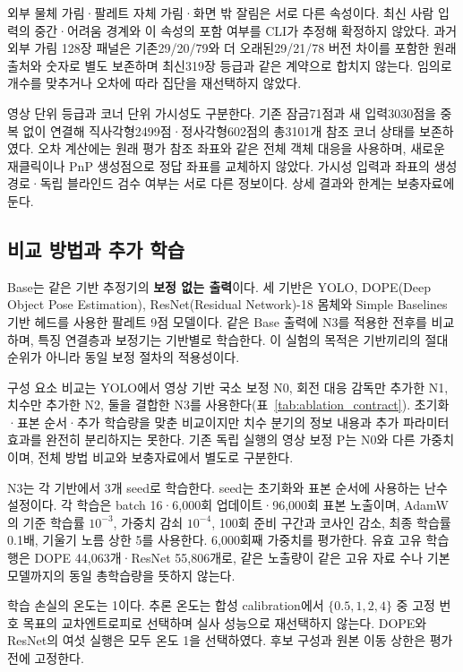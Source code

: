 외부 물체 가림·팔레트 자체 가림·화면 밖 잘림은 서로 다른 속성이다. 최신 사람 입력의 중간·어려움 경계와 이 속성의 포함 여부를 CLI가 추정해 확정하지 않았다. 과거 외부 가림 128장 패널은 기존29/20/79와 더 오래된29/21/78 버전 차이를 포함한 원래 출처와 숫자로 별도 보존하며 최신319장 등급과 같은 계약으로 합치지 않는다. 임의로 개수를 맞추거나 오차에 따라 집단을 재선택하지 않았다.

영상 단위 등급과 코너 단위 가시성도 구분한다. 기존 잠금71점과 새 입력3030점을 중복 없이 연결해 직사각형2499점·정사각형602점의 총3101개 참조 코너 상태를 보존하였다. 오차 계산에는 원래 평가 참조 좌표와 같은 전체 객체 대응을 사용하며, 새로운 재클릭이나 PnP 생성점으로 정답 좌표를 교체하지 않았다. 가시성 입력과 좌표의 생성 경로·독립 블라인드 검수 여부는 서로 다른 정보이다. 상세 결과와 한계는 보충자료에 둔다.


\subsection{비교 방법과 추가 학습}
Base는 같은 기반 추정기의 \textbf{보정 없는 출력}이다. 세 기반은 YOLO, DOPE(Deep Object Pose Estimation)\cite{dope2018}, ResNet(Residual Network)-18 몸체\cite{resnet2016}와 Simple Baselines 기반 헤드\cite{simple2018}를 사용한 팔레트 9점 모델이다. 같은 Base 출력에 N3를 적용한 전후를 비교하며, 특징 연결층과 보정기는 기반별로 학습한다. 이 실험의 목적은 기반끼리의 절대 순위가 아니라 동일 보정 절차의 적용성이다.

구성 요소 비교는 YOLO에서 영상 기반 국소 보정 N0, 회전 대응 감독만 추가한 N1, 치수만 추가한 N2, 둘을 결합한 N3를 사용한다(표~\ref{tab:ablation_contract}). 초기화·표본 순서·추가 학습량을 맞춘 비교이지만 치수 분기의 정보 내용과 추가 파라미터 효과를 완전히 분리하지는 못한다. 기존 독립 실행의 영상 보정 P는 N0와 다른 가중치이며, 전체 방법 비교와 보충자료에서 별도로 구분한다.


N3는 각 기반에서 3개 seed로 학습한다. seed는 초기화와 표본 순서에 사용하는 난수 설정이다. 각 학습은 batch 16·6,000회 업데이트·96,000회 표본 노출이며, AdamW의 기준 학습률 $10^{-3}$, 가중치 감쇠 $10^{-4}$, 100회 준비 구간과 코사인 감소, 최종 학습률 0.1배, 기울기 노름 상한 5를 사용한다. 6,000회째 가중치를 평가한다. 유효 고유 학습 행은 DOPE 44,063개·ResNet 55,806개로, 같은 노출량이 같은 고유 자료 수나 기본 모델까지의 동일 총학습량을 뜻하지 않는다.

학습 손실의 온도는 1이다. 추론 온도는 합성 calibration에서 $\{0.5,1,2,4\}$ 중 고정 번호 목표의 교차엔트로피로 선택하며 실사 성능으로 재선택하지 않는다. DOPE와 ResNet의 여섯 실행은 모두 온도 1을 선택하였다. 후보 구성과 원본 이동 상한은 평가 전에 고정한다.

